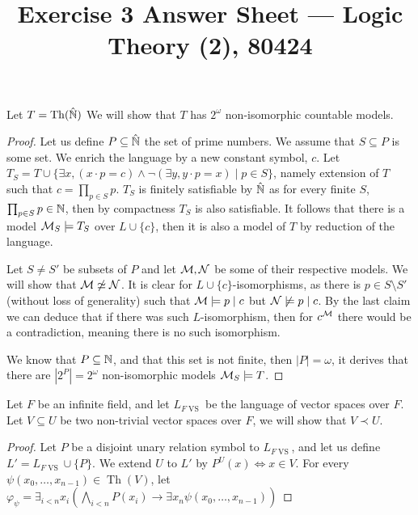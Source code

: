 
\title{Exercise 3 Answer Sheet --- Logic Theory (2), 80424}


\maketitle
\maketitleprint{}

\question{}
Let $T = \operatorname{Th}(\hat{\mathbb{N}})$
We will show that $T$ has $2^\omega$ non-isomorphic countable models.
\begin{proof}
	Let us define $P \subseteq \hat{\mathbb{N}}$ the set of prime numbers.
	We assume that $S \subseteq P$ is some set.
	We enrich the language by a new constant symbol, $c$.
	Let $T_S = T \cup \{ \exists x, (x \cdot p = c) \land \lnot (\exists y, y \cdot p = x) \mid p \in S \}$, namely extension of $T$ such that $c = \prod_{p \in S} p$.
	$T_S$ is finitely satisfiable by $\hat{\mathbb{N}}$ as for every finite $S$, $\prod_{p \in S} p \in \mathbb{N}$, then by compactness $T_S$ is also satisfiable.
	It follows that there is a model $\mathcal{M}_S \models T_S$ over $L \cup \{ c \}$, then it is also a model of $T$ by reduction of the language.
	
	Let $S \ne S'$ be subsets of $P$ and let $\mathcal{M}, \mathcal{N}$ be some of their respective models.
	We will show that $\mathcal{M} \not\simeq \mathcal{N}$.
	It is clear for $L \cup \{ c \}$-isomorphisms, as there is $p \in S \setminus S'$ (without loss of generality) such that $\mathcal{M} \models p \mid c$ but $\mathcal{N} \not\models p \mid c$.
	By the last claim we can deduce that if there was such $L$-isomorphism, then for $c^{\mathcal{M}}$ there would be a contradiction, meaning there is no such isomorphism.

	We know that $P \subseteq \mathbb{N}$, and that this set is not finite, then $|P| = \omega$, it derives that there are $|2^P| = 2^\omega$ non-isomorphic models $\mathcal{M}_S \models T$.
\end{proof}

\question{}
Let $F$ be an infinite field, and let $L_{F \operatorname{VS}}$ be the language of vector spaces over $F$.
Let $V \subseteq U$ be two non-trivial vector spaces over $F$, we will show that $V \prec U$.
\begin{proof}
	Let $P$ be a disjoint unary relation symbol to $L_{F \operatorname{VS}}$, and let us define $L' = L_{F \operatorname{VS}} \cup \{ P \}$.
	We extend $U$ to $L'$ by $P^U(x) \iff x \in V$.
	For every $\psi(x_0, \ldots, x_{n - 1}) \in \operatorname{Th}(V)$, let $\varphi_{\psi} = \exists_{i < n} x_i (\bigwedge_{i < n} P(x_i) \rightarrow \exists x_n \psi(x_0, \ldots, x_{n - 1}))$
\end{proof}


